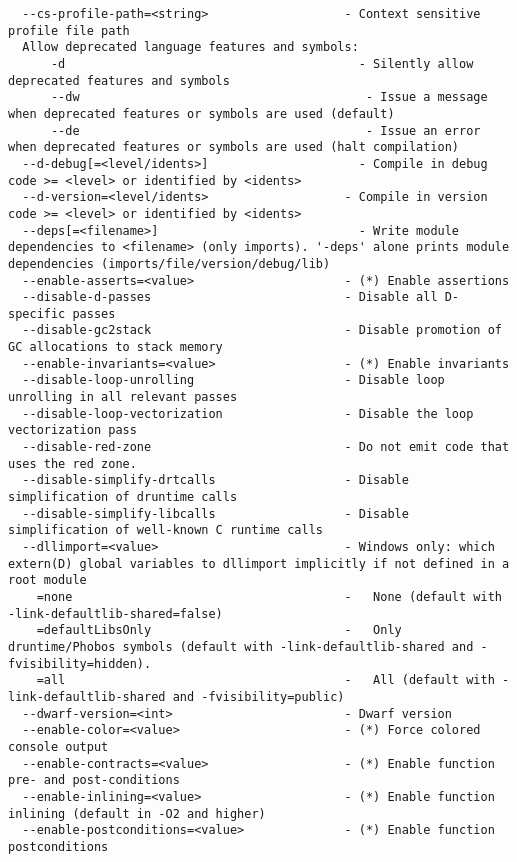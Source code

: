 \documentclass{studrep}
\begin{document}
\begin{verbatim}
  --cs-profile-path=<string>                   - Context sensitive profile file path
  Allow deprecated language features and symbols:
      -d                                         - Silently allow deprecated features and symbols
      --dw                                        - Issue a message when deprecated features or symbols are used (default)
      --de                                        - Issue an error when deprecated features or symbols are used (halt compilation)
  --d-debug[=<level/idents>]                     - Compile in debug code >= <level> or identified by <idents>
  --d-version=<level/idents>                   - Compile in version code >= <level> or identified by <idents>
  --deps[=<filename>]                            - Write module dependencies to <filename> (only imports). '-deps' alone prints module dependencies (imports/file/version/debug/lib)
  --enable-asserts=<value>                     - (*) Enable assertions
  --disable-d-passes                           - Disable all D-specific passes
  --disable-gc2stack                           - Disable promotion of GC allocations to stack memory
  --enable-invariants=<value>                  - (*) Enable invariants
  --disable-loop-unrolling                     - Disable loop unrolling in all relevant passes
  --disable-loop-vectorization                 - Disable the loop vectorization pass
  --disable-red-zone                           - Do not emit code that uses the red zone.
  --disable-simplify-drtcalls                  - Disable simplification of druntime calls
  --disable-simplify-libcalls                  - Disable simplification of well-known C runtime calls
  --dllimport=<value>                          - Windows only: which extern(D) global variables to dllimport implicitly if not defined in a root module
    =none                                      -   None (default with -link-defaultlib-shared=false)
    =defaultLibsOnly                           -   Only druntime/Phobos symbols (default with -link-defaultlib-shared and -fvisibility=hidden).
    =all                                       -   All (default with -link-defaultlib-shared and -fvisibility=public)
  --dwarf-version=<int>                        - Dwarf version
  --enable-color=<value>                       - (*) Force colored console output
  --enable-contracts=<value>                   - (*) Enable function pre- and post-conditions
  --enable-inlining=<value>                    - (*) Enable function inlining (default in -O2 and higher)
  --enable-postconditions=<value>              - (*) Enable function postconditions

\end{verbatim}
\end{document}
